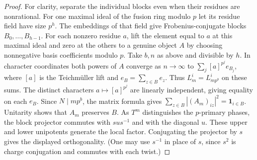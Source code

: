 \documentclass[11pt]{amsart}
\numberwithin{equation}{section}
\begin{document}
\begin{proof}
For clarity, separate the individual blocks even when their residues are nonrational. For one maximal ideal of the fusion ring modulo $p$ let its residue field have size $p^h$. The embeddings of that field give Frobenius-conjugate blocks $B_0,\ldots,B_{h-1}$. For each nonzero residue $a$, lift the element equal to $a$ at this maximal ideal and zero at the others to a genuine object $A$ by choosing nonnegative basis coefficients modulo $p$. Take $b,n$ as above and divisible by $h$. In character coordinates both powers of $A$ converge as $n\to\infty$ to $\sum_j [a]^{p^j}e_{B_j}$, where $[a]$ is the Teichm\"uller lift and $e_B=\sum_{z\in B}e_z$. Thus $L_m^i=L_{mp^b}^i$ on these sums. The distinct characters $a\mapsto[a]^{p^j}$ are linearly independent, giving equality on each $e_B$. Since $N\mid mp^b$, the matrix formula gives $\sum_{z\in B}|(A_m)_{iz}|^2=\mathbf1_{i\in B}$. Unitarity shows that $A_m$ preserves $B$. As $T^m$ distinguishes the $p$-primary phases, the block projector commutes with $s u s^{-1}$ and with the diagonal $u$. These upper and lower unipotents generate the local factor. Conjugating the projector by $s$ gives the displayed orthogonality. (One may use $s^{-1}$ in place of $s$, since $s^2$ is charge conjugation and commutes with each twist.)
\end{proof}
\end{document}
